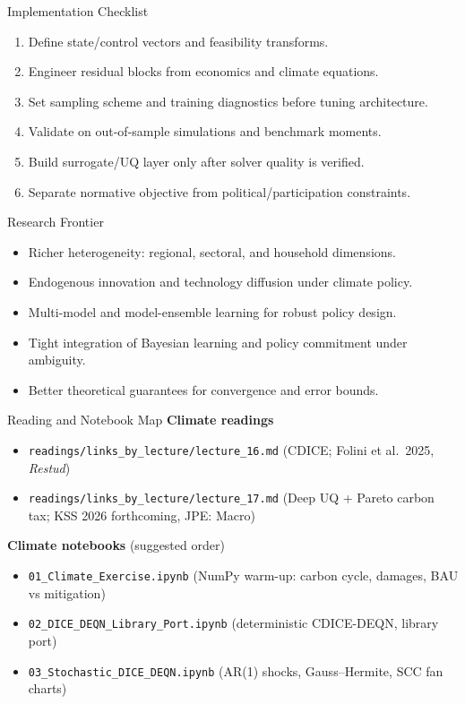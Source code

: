 \documentclass[aspectratio=169,11pt]{beamer}
\begin{document}
\begin{frame}{Implementation Checklist}
\small
\begin{enumerate}
    \item Define state/control vectors and feasibility transforms.
    \item Engineer residual blocks from economics and climate equations.
    \item Set sampling scheme and training diagnostics before tuning architecture.
    \item Validate on out-of-sample simulations and benchmark moments.
    \item Build surrogate/UQ layer only after solver quality is verified.
    \item Separate normative objective from political/participation constraints.
\end{enumerate}
\end{frame}

\begin{frame}{Research Frontier}
\begin{itemize}
    \item Richer heterogeneity: regional, sectoral, and household dimensions.
    \item Endogenous innovation and technology diffusion under climate policy.
    \item Multi-model and model-ensemble learning for robust policy design.
    \item Tight integration of Bayesian learning and policy commitment under ambiguity.
    \item Better theoretical guarantees for convergence and error bounds.
\end{itemize}
\end{frame}

\begin{frame}{Reading and Notebook Map}
\small
\textbf{Climate readings}
\begin{itemize}
    \item \texttt{readings/links\_by\_lecture/lecture\_16.md} \hfill (CDICE; Folini et al.\ 2025, \emph{Restud})
    \item \texttt{readings/links\_by\_lecture/lecture\_17.md} \hfill (Deep UQ + Pareto carbon tax; KSS 2026 forthcoming, JPE: Macro)
\end{itemize}

\vspace{0.2cm}
\textbf{Climate notebooks} (suggested order)
\begin{itemize}
    \item \texttt{01\_Climate\_Exercise.ipynb} \hfill (NumPy warm-up: carbon cycle, damages, BAU vs mitigation)
    \item \texttt{02\_DICE\_DEQN\_Library\_Port.ipynb} \hfill (deterministic CDICE-DEQN, library port)
    \item \texttt{03\_Stochastic\_DICE\_DEQN.ipynb} \hfill (AR(1) shocks, Gauss--Hermite, SCC fan charts)
\end{itemize}
\end{frame}
\end{document}
